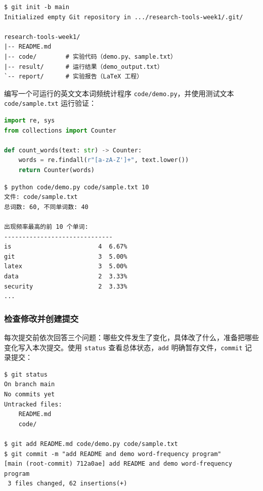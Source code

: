 \documentclass{SYSUReport}
\begin{document}
\begin{lstlisting}[caption={初始化仓库与目录结构}]
$ git init -b main
Initialized empty Git repository in .../research-tools-week1/.git/

research-tools-week1/
|-- README.md
|-- code/        # 实验代码（demo.py、sample.txt）
|-- result/      # 运行结果（demo_output.txt）
`-- report/      # 实验报告（LaTeX 工程）
\end{lstlisting}

编写一个可运行的英文文本词频统计程序 \texttt{code/demo.py}，并使用测试文本 \texttt{code/sample.txt} 运行验证：

\begin{lstlisting}[language=Python, caption={词频统计程序 code/demo.py（节选）}]
import re, sys
from collections import Counter

def count_words(text: str) -> Counter:
    words = re.findall(r"[a-zA-Z']+", text.lower())
    return Counter(words)
\end{lstlisting}

\begin{lstlisting}[caption={运行词频统计程序}]
$ python code/demo.py code/sample.txt 10
文件: code/sample.txt
总词数: 60, 不同单词数: 40

出现频率最高的前 10 个单词:
------------------------------
is                        4  6.67%
git                       3  5.00%
latex                     3  5.00%
data                      2  3.33%
security                  2  3.33%
...
\end{lstlisting}

\subsubsection{检查修改并创建提交}

每次提交前依次回答三个问题：哪些文件发生了变化，具体改了什么，准备把哪些变化写入本次提交。使用 \texttt{status} 查看总体状态，\texttt{add} 明确暂存文件，\texttt{commit} 记录提交：

\begin{lstlisting}[caption={第一次提交：README 与可运行程序}]
$ git status
On branch main
No commits yet
Untracked files:
	README.md
	code/

$ git add README.md code/demo.py code/sample.txt
$ git commit -m "add README and demo word-frequency program"
[main (root-commit) 712a0ae] add README and demo word-frequency program
 3 files changed, 62 insertions(+)
\end{lstlisting}
\end{document}
